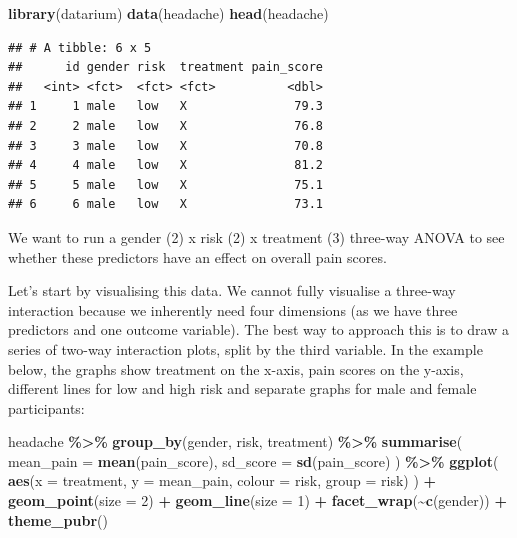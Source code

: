 \documentclass[
]{book}
\newenvironment{Shaded}{\begin{snugshade}}{\end{snugshade}}
\newcommand{\AttributeTok}[1]{\textcolor[rgb]{0.13,0.29,0.53}{#1}}
\newcommand{\DecValTok}[1]{\textcolor[rgb]{0.00,0.00,0.81}{#1}}
\newcommand{\FunctionTok}[1]{\textcolor[rgb]{0.13,0.29,0.53}{\textbf{#1}}}
\newcommand{\NormalTok}[1]{#1}
\newcommand{\SpecialCharTok}[1]{\textcolor[rgb]{0.81,0.36,0.00}{\textbf{#1}}}
\begin{document}
\begin{Shaded}
\begin{Highlighting}[]
\FunctionTok{library}\NormalTok{(datarium)}
\FunctionTok{data}\NormalTok{(headache)}
\FunctionTok{head}\NormalTok{(headache)}
\end{Highlighting}
\end{Shaded}

\begin{verbatim}
## # A tibble: 6 x 5
##      id gender risk  treatment pain_score
##   <int> <fct>  <fct> <fct>          <dbl>
## 1     1 male   low   X               79.3
## 2     2 male   low   X               76.8
## 3     3 male   low   X               70.8
## 4     4 male   low   X               81.2
## 5     5 male   low   X               75.1
## 6     6 male   low   X               73.1
\end{verbatim}

We want to run a gender (2) x risk (2) x treatment (3) three-way ANOVA to see whether these predictors have an effect on overall pain scores.

Let's start by visualising this data. We cannot fully visualise a three-way interaction because we inherently need four dimensions (as we have three predictors and one outcome variable). The best way to approach this is to draw a series of two-way interaction plots, split by the third variable. In the example below, the graphs show treatment on the x-axis, pain scores on the y-axis, different lines for low and high risk and separate graphs for male and female participants:

\begin{Shaded}
\begin{Highlighting}[]
\NormalTok{headache }\SpecialCharTok{\%\textgreater{}\%}
  \FunctionTok{group\_by}\NormalTok{(gender, risk, treatment) }\SpecialCharTok{\%\textgreater{}\%}
  \FunctionTok{summarise}\NormalTok{(}
    \AttributeTok{mean\_pain =} \FunctionTok{mean}\NormalTok{(pain\_score),}
    \AttributeTok{sd\_score =} \FunctionTok{sd}\NormalTok{(pain\_score)}
\NormalTok{  ) }\SpecialCharTok{\%\textgreater{}\%}
  \FunctionTok{ggplot}\NormalTok{(}
    \FunctionTok{aes}\NormalTok{(}\AttributeTok{x =}\NormalTok{ treatment, }\AttributeTok{y =}\NormalTok{ mean\_pain, }\AttributeTok{colour =}\NormalTok{ risk, }\AttributeTok{group =}\NormalTok{ risk)}
\NormalTok{  ) }\SpecialCharTok{+}
  \FunctionTok{geom\_point}\NormalTok{(}\AttributeTok{size =} \DecValTok{2}\NormalTok{) }\SpecialCharTok{+}
  \FunctionTok{geom\_line}\NormalTok{(}\AttributeTok{size =} \DecValTok{1}\NormalTok{) }\SpecialCharTok{+}
  \FunctionTok{facet\_wrap}\NormalTok{(}\SpecialCharTok{\textasciitilde{}}\FunctionTok{c}\NormalTok{(gender)) }\SpecialCharTok{+}
  \FunctionTok{theme\_pubr}\NormalTok{()}
\end{Highlighting}
\end{Shaded}
\end{document}
